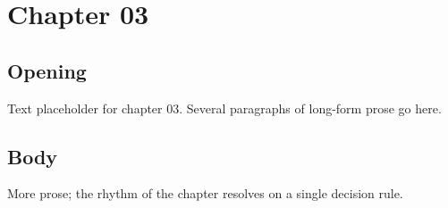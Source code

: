 \chapter{Chapter 03}
\section{Opening}
Text placeholder for chapter 03. Several paragraphs of long-form prose go here.
\section{Body}
More prose; the rhythm of the chapter resolves on a single decision rule.
